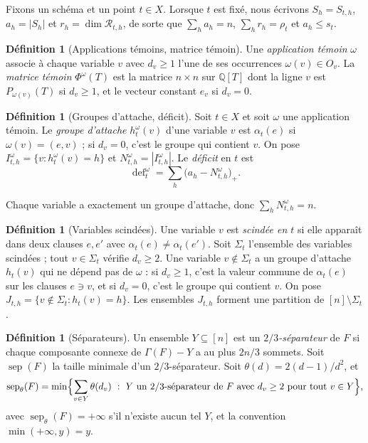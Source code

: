 \documentclass[11pt,a4paper]{article}
\theoremstyle{definition}
\newtheorem{definition}[theorem]{Définition}
\theoremstyle{remark}
\newcommand{\Q}{\mathbb{Q}}
\newcommand{\cR}{\mathcal{R}}
\newcommand{\sep}{\operatorname{sep}}
\newcommand{\sepw}{\operatorname{sep}_{\theta}}
\newcommand{\dfc}{\operatorname{def}}
\newcommand{\Gr}{\Gamma}
\begin{document}
Fixons un schéma et un point $t\in X$. Lorsque $t$ est fixé, nous écrivons $S_h=S_{t,h}$,
$a_h=|S_h|$ et $r_h=\dim\cR_{t,h}$, de sorte que $\sum_ha_h=n$, $\sum_hr_h=\rho_t$ et
$a_h\le s_t$.

\begin{definition}[Applications témoins, matrice témoin]\label{def:witness}
Une \emph{application témoin} $\omega$ associe à chaque variable $v$ avec $d_v\ge1$ l'une de
ses occurrences $\omega(v)\in O_v$. La \emph{matrice témoin} $\Phi^\omega(T)$ est la matrice
$n\times n$ sur $\Q[T]$ dont la ligne $v$ est $P_{\omega(v)}(T)$ si $d_v\ge1$, et le vecteur
constant $e_v$ si $d_v=0$.
\end{definition}

\begin{definition}[Groupes d'attache, déficit]\label{def:def}
Soit $t\in X$ et soit $\omega$ une application témoin. Le \emph{groupe d'attache}
$h^\omega_t(v)$ d'une variable $v$ est $\alpha_t(e)$ si $\omega(v)=(e,v)$ ; si $d_v=0$,
c'est le groupe qui contient $v$. On pose $I^\omega_{t,h}=\{v:h^\omega_t(v)=h\}$ et
$N^\omega_{t,h}=|I^\omega_{t,h}|$. Le \emph{déficit} en $t$ est
\[
\dfc^\omega_t=\sum_h\bigl(a_h-N^\omega_{t,h}\bigr)_+ .
\]
\end{definition}

Chaque variable a exactement un groupe d'attache, donc $\sum_hN^\omega_{t,h}=n$.

\begin{definition}[Variables scindées]\label{def:split}
Une variable $v$ est \emph{scindée en $t$} si elle apparaît dans deux clauses $e,e'$ avec
$\alpha_t(e)\ne\alpha_t(e')$. Soit $\Sigma_t$ l'ensemble des variables scindées ; tout
$v\in\Sigma_t$ vérifie $d_v\ge2$. Une variable $v\notin\Sigma_t$ a un groupe d'attache
$h_t(v)$ qui ne dépend pas de $\omega$ : si $d_v\ge1$, c'est la valeur commune de
$\alpha_t(e)$ sur les clauses $e\ni v$, et si $d_v=0$, c'est le groupe qui contient $v$. On
pose $J_{t,h}=\{v\notin\Sigma_t:h_t(v)=h\}$. Les ensembles $J_{t,h}$ forment une partition
de $[n]\setminus\Sigma_t$.
\end{definition}

\begin{definition}[Séparateurs]\label{def:sep}
Un ensemble $Y\subseteq[n]$ est un \emph{$2/3$-séparateur} de $F$ si chaque composante
connexe de $\Gr(F)-Y$ a au plus $2n/3$ sommets. Soit $\sep(F)$ la taille minimale d'un
$2/3$-séparateur. Soit $\theta(d)=2(d-1)/d^2$, et
\[
\sepw(F)=\min\Bigl\{\sum_{v\in Y}\theta(d_v)\ :\ Y\text{ un }2/3\text{-séparateur de }F
\text{ avec }d_v\ge2\text{ pour tout }v\in Y\Bigr\},
\]
avec $\sepw(F)=+\infty$ s'il n'existe aucun tel $Y$, et la convention $\min(+\infty,y)=y$.
\end{definition}
\end{document}
